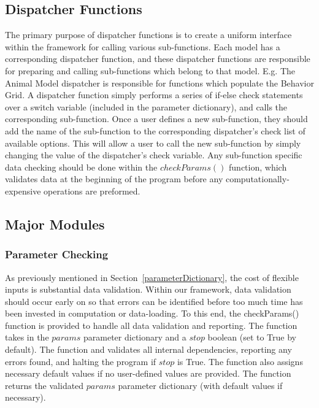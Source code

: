 \subsection{Dispatcher Functions}
\label{dispatcherFunctions}
The primary purpose of dispatcher functions is to create a uniform interface within the framework for calling various sub-functions.  Each model has a corresponding dispatcher function, and these dispatcher functions are responsible for preparing and calling sub-functions which belong to that model.  E.g. The Animal Model dispatcher is responsible for functions which populate the Behavior Grid.  A dispatcher function simply performs a series of if-else check statements over a switch variable (included in the parameter dictionary), and calls the corresponding sub-function.  Once a user defines a new sub-function, they should add the name of the sub-function to the corresponding dispatcher's check list of available options.  This will allow a user to call the new sub-function by simply changing the value of the dispatcher's check variable.  Any sub-function specific data checking should be done within the $checkParams()$ function, which validates data at the beginning of the program before any computationally-expensive operations are preformed.


\subsection{Major Modules}
\label{majorModules}
\subsubsection{Parameter Checking}
\label{checkParams}
As previously mentioned in Section~\ref{parameterDictionary}, the cost of flexible inputs is substantial data validation.  Within our framework, data validation should occur early on so that errors can be identified before too much time has been invested in computation or data-loading.  To this end, the checkParams() function is provided to handle all data validation and reporting.  The function takes in the $params$ parameter dictionary and a $stop$ boolean (set to True by default).  The function and validates all internal dependencies, reporting any errors found, and halting the program if $stop$ is True.  The function also assigns necessary default values if no user-defined values are provided.  The function returns the validated $params$ parameter dictionary (with default values if necessary).  

